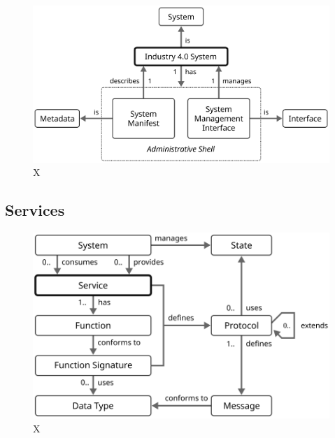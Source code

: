 \begin{figure}[ht!]
  \centering
  \includegraphics{figures/system-industry40}
  \caption{
    X
  }
  \label{fig:system-industry40}
\end{figure}

\subsection{Services}

\begin{figure}[ht!]
  \centering
  \includegraphics{figures/service}
  \caption{
    X
  }
  \label{fig:service}
\end{figure}